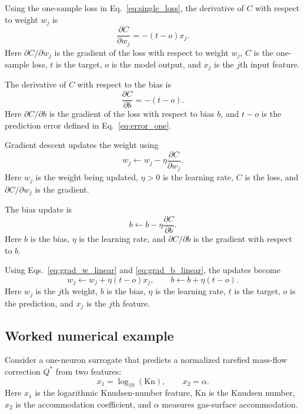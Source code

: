 \documentclass[11pt]{article}
\newcommand{\kn}{\mathrm{Kn}}
\begin{document}
Using the one-sample loss in Eq.~\eqref{eq:single_loss}, the derivative of $C$ with respect to weight $w_j$ is
\begin{equation}
    \frac{\partial C}{\partial w_j} = -(t-o)x_j.
    \label{eq:grad_w_linear}
\end{equation}
Here $\partial C/\partial w_j$ is the gradient of the loss with respect to weight $w_j$, $C$ is the one-sample loss, $t$ is the target, $o$ is the model output, and $x_j$ is the $j$th input feature.

The derivative of $C$ with respect to the bias is
\begin{equation}
    \frac{\partial C}{\partial b} = -(t-o).
    \label{eq:grad_b_linear}
\end{equation}
Here $\partial C/\partial b$ is the gradient of the loss with respect to bias $b$, and $t-o$ is the prediction error defined in Eq.~\eqref{eq:error_one}.

Gradient descent updates the weight using
\begin{equation}
    w_j \leftarrow w_j - \eta\frac{\partial C}{\partial w_j}.
    \label{eq:gd_w}
\end{equation}
Here $w_j$ is the weight being updated, $\eta>0$ is the learning rate, $C$ is the loss, and $\partial C/\partial w_j$ is the gradient.

The bias update is
\begin{equation}
    b \leftarrow b - \eta\frac{\partial C}{\partial b}.
    \label{eq:gd_b}
\end{equation}
Here $b$ is the bias, $\eta$ is the learning rate, and $\partial C/\partial b$ is the gradient with respect to $b$.

Using Eqs.~\eqref{eq:grad_w_linear} and \eqref{eq:grad_b_linear}, the updates become
\begin{equation}
    w_j \leftarrow w_j + \eta(t-o)x_j, \qquad b \leftarrow b + \eta(t-o).
    \label{eq:perceptron_like_update}
\end{equation}
Here $w_j$ is the $j$th weight, $b$ is the bias, $\eta$ is the learning rate, $t$ is the target, $o$ is the prediction, and $x_j$ is the $j$th feature.

\subsection{Worked numerical example}

Consider a one-neuron surrogate that predicts a normalized rarefied mass-flow correction $Q^*$ from two features:
\begin{equation}
    x_1 = \log_{10}(\kn), \qquad x_2 = \alpha.
    \label{eq:example_features}
\end{equation}
Here $x_1$ is the logarithmic Knudsen-number feature, $\kn$ is the Knudsen number, $x_2$ is the accommodation coefficient, and $\alpha$ measures gas-surface accommodation.
\end{document}
